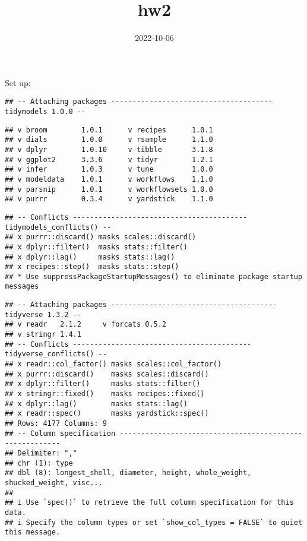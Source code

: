 \documentclass[
]{article}
\title{hw2}
\author{}
\date{\vspace{-2.5em}2022-10-06}
\begin{document}
\maketitle

Set up:

\begin{verbatim}
## -- Attaching packages -------------------------------------- tidymodels 1.0.0 --
\end{verbatim}

\begin{verbatim}
## v broom        1.0.1      v recipes      1.0.1 
## v dials        1.0.0      v rsample      1.1.0 
## v dplyr        1.0.10     v tibble       3.1.8 
## v ggplot2      3.3.6      v tidyr        1.2.1 
## v infer        1.0.3      v tune         1.0.0 
## v modeldata    1.0.1      v workflows    1.1.0 
## v parsnip      1.0.1      v workflowsets 1.0.0 
## v purrr        0.3.4      v yardstick    1.1.0
\end{verbatim}

\begin{verbatim}
## -- Conflicts ----------------------------------------- tidymodels_conflicts() --
## x purrr::discard() masks scales::discard()
## x dplyr::filter()  masks stats::filter()
## x dplyr::lag()     masks stats::lag()
## x recipes::step()  masks stats::step()
## * Use suppressPackageStartupMessages() to eliminate package startup messages
\end{verbatim}

\begin{verbatim}
## -- Attaching packages --------------------------------------- tidyverse 1.3.2 --
## v readr   2.1.2     v forcats 0.5.2
## v stringr 1.4.1     
## -- Conflicts ------------------------------------------ tidyverse_conflicts() --
## x readr::col_factor() masks scales::col_factor()
## x purrr::discard()    masks scales::discard()
## x dplyr::filter()     masks stats::filter()
## x stringr::fixed()    masks recipes::fixed()
## x dplyr::lag()        masks stats::lag()
## x readr::spec()       masks yardstick::spec()
## Rows: 4177 Columns: 9
## -- Column specification --------------------------------------------------------
## Delimiter: ","
## chr (1): type
## dbl (8): longest_shell, diameter, height, whole_weight, shucked_weight, visc...
## 
## i Use `spec()` to retrieve the full column specification for this data.
## i Specify the column types or set `show_col_types = FALSE` to quiet this message.
\end{verbatim}
\end{document}
